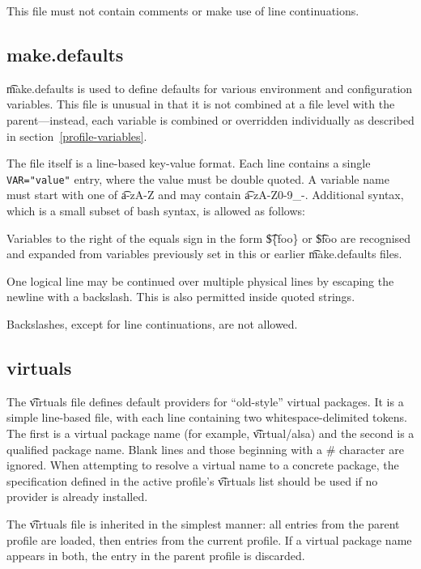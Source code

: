 This file must not contain comments or make use of line continuations.

\subsection{make.defaults}
\t{make.defaults} is used to define defaults for various environment and configuration variables.
This file is unusual in that it is not combined at a file level with the parent---instead, each
variable is combined or overridden individually as described in section~\ref{profile-variables}.

The file itself is a line-based key-value format. Each line contains a single \verb|VAR="value"|
entry, where the value must be double quoted. A variable name must start with one of \t{a-zA-Z}
and may contain \t{a-zA-Z0-9\_-}. Additional syntax, which is a small subset of
bash syntax, is allowed as follows:

\begin{compactitem}
\item Variables to the right of the equals sign in the form \t{\$\{foo\}} or \t{\$foo} are recognised and
  expanded from variables previously set in this or earlier \t{make.defaults} files.
\item One logical line may be continued over multiple physical lines by escaping the newline with a
  backslash. This is also permitted inside quoted strings.
\item Backslashes, except for line continuations, are not allowed.
\end{compactitem}

\subsection{virtuals}
\label{profiles-virtuals}
The \t{virtuals} file defines default providers for ``old-style'' virtual packages. It is a simple
line-based file, with each line containing two whitespace-delimited tokens. The first is a virtual
package name (for example, \t{virtual/alsa}) and the second is a qualified package name. Blank lines
and those beginning with a \# character are ignored. When attempting to resolve a virtual name to a
concrete package, the specification defined in the active profile's \t{virtuals} list should be used if no
provider is already installed.

The \t{virtuals} file is inherited in the simplest manner: all entries from the parent profile are
loaded, then entries from the current profile. If a virtual package name appears in both, the entry
in the parent profile is discarded.


